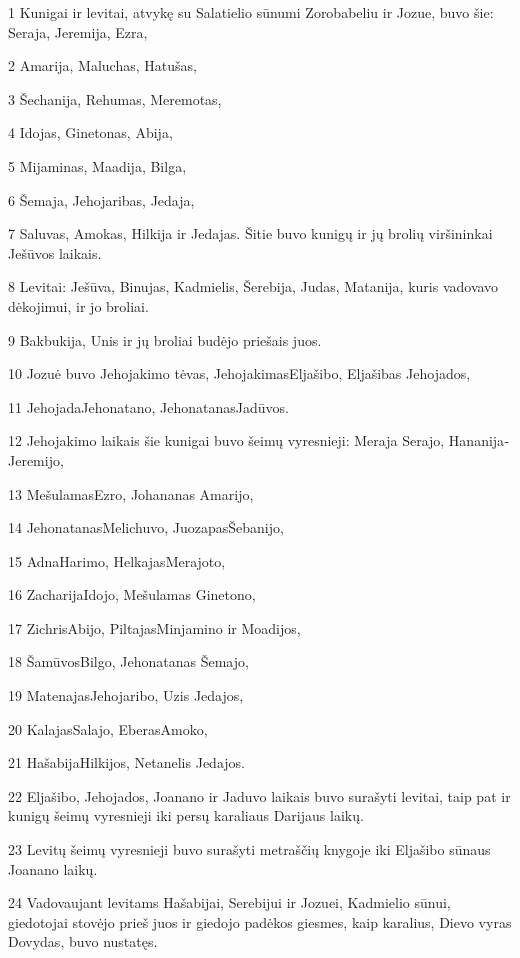 \par 1 Kunigai ir levitai, atvykę su Salatielio sūnumi Zorobabeliu ir Jozue, buvo šie: Seraja, Jeremija, Ezra, 
\par 2 Amarija, Maluchas, Hatušas, 
\par 3 Šechanija, Rehumas, Meremotas, 
\par 4 Idojas, Ginetonas, Abija, 
\par 5 Mijaminas, Maadija, Bilga, 
\par 6 Šemaja, Jehojaribas, Jedaja, 
\par 7 Saluvas, Amokas, Hilkija ir Jedajas. Šitie buvo kunigų ir jų brolių viršininkai Ješūvos laikais. 
\par 8 Levitai: Ješūva, Binujas, Kadmielis, Šerebija, Judas, Matanija, kuris vadovavo dėkojimui, ir jo broliai. 
\par 9 Bakbukija, Unis ir jų broliai budėjo priešais juos. 
\par 10 Jozuė buvo Jehojakimo tėvas, Jehojakimas­Eljašibo, Eljašibas­ Jehojados, 
\par 11 Jehojada­Jehonatano, Jehonatanas­Jadūvos. 
\par 12 Jehojakimo laikais šie kunigai buvo šeimų vyresnieji: Meraja­ Serajo, Hananija­Jeremijo, 
\par 13 Mešulamas­Ezro, Johananas­ Amarijo, 
\par 14 Jehonatanas­Melichuvo, Juozapas­Šebanijo, 
\par 15 Adna­Harimo, Helkajas­Merajoto, 
\par 16 Zacharija­Idojo, Mešulamas­ Ginetono, 
\par 17 Zichris­Abijo, Piltajas­Minjamino ir Moadijos, 
\par 18 Šamūvos­Bilgo, Jehonatanas­ Šemajo, 
\par 19 Matenajas­Jehojaribo, Uzis­ Jedajos, 
\par 20 Kalajas­Salajo, Eberas­Amoko, 
\par 21 Hašabija­Hilkijos, Netanelis­ Jedajos. 
\par 22 Eljašibo, Jehojados, Joanano ir Jaduvo laikais buvo surašyti levitai, taip pat ir kunigų šeimų vyresnieji iki persų karaliaus Darijaus laikų. 
\par 23 Levitų šeimų vyresnieji buvo surašyti metraščių knygoje iki Eljašibo sūnaus Joanano laikų. 
\par 24 Vadovaujant levitams Hašabijai, Serebijui ir Jozuei, Kadmielio sūnui, giedotojai stovėjo prieš juos ir giedojo padėkos giesmes, kaip karalius, Dievo vyras Dovydas, buvo nustatęs. 
